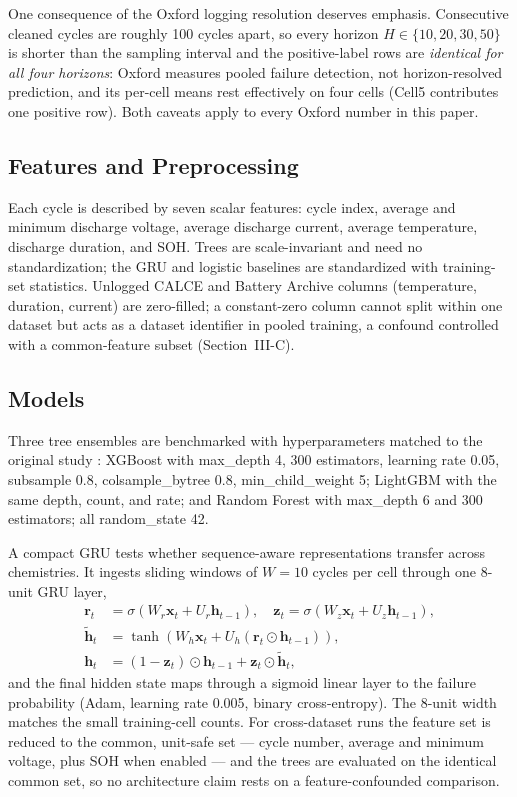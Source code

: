 \documentclass[11pt,a4paper]{article}
\begin{document}
One consequence of the Oxford logging resolution deserves emphasis. Consecutive cleaned cycles are roughly 100 cycles apart, so every horizon $H\in\{10,20,30,50\}$ is shorter than the sampling interval and the positive-label rows are \emph{identical for all four horizons}: Oxford measures pooled failure detection, not horizon-resolved prediction, and its per-cell means rest effectively on four cells (Cell5 contributes one positive row). Both caveats apply to every Oxford number in this paper.

\subsection{Features and Preprocessing}
Each cycle is described by seven scalar features: cycle index, average and minimum discharge voltage, average discharge current, average temperature, discharge duration, and SOH. Trees are scale-invariant and need no standardization; the GRU and logistic baselines are standardized with training-set statistics. Unlogged CALCE and Battery Archive columns (temperature, duration, current) are zero-filled; a constant-zero column cannot split within one dataset but acts as a dataset identifier in pooled training, a confound controlled with a common-feature subset (Section~III-C).

\subsection{Models}
Three tree ensembles are benchmarked with hyperparameters matched to the original study \cite{shikdar2026learning}: XGBoost \cite{chen2016xgboost} with max\_depth 4, 300 estimators, learning rate 0.05, subsample 0.8, colsample\_bytree 0.8, min\_child\_weight 5; LightGBM \cite{ke2017lightgbm} with the same depth, count, and rate; and Random Forest \cite{breiman2001random} with max\_depth 6 and 300 estimators; all random\_state 42.

A compact GRU \cite{cho2014learning} tests whether sequence-aware representations transfer across chemistries. It ingests sliding windows of $W{=}10$ cycles per cell through one 8-unit GRU layer,
\begin{equation}\label{eq:gru}
\begin{aligned}
\mathbf{r}_t &= \sigma(W_r\mathbf{x}_t + U_r\mathbf{h}_{t-1}),\quad
\mathbf{z}_t = \sigma(W_z\mathbf{x}_t + U_z\mathbf{h}_{t-1}),\\
\tilde{\mathbf{h}}_t &= \tanh(W_h\mathbf{x}_t + U_h(\mathbf{r}_t\odot\mathbf{h}_{t-1})),\\
\mathbf{h}_t &= (1-\mathbf{z}_t)\odot\mathbf{h}_{t-1} + \mathbf{z}_t\odot\tilde{\mathbf{h}}_t,
\end{aligned}
\end{equation}
and the final hidden state maps through a sigmoid linear layer to the failure probability (Adam, learning rate 0.005, binary cross-entropy). The 8-unit width matches the small training-cell counts. For cross-dataset runs the feature set is reduced to the common, unit-safe set --- cycle number, average and minimum voltage, plus SOH when enabled --- and the trees are evaluated on the identical common set, so no architecture claim rests on a feature-confounded comparison.
\end{document}
